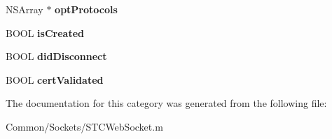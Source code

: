 \begin{DoxyCompactItemize}
N\+S\+Array $\ast$ {\bfseries opt\+Protocols}
\item 
\hypertarget{category_s_t_c_web_socket_07_08_a173c79402beec0cdde99c56f11dd463b}{}\label{category_s_t_c_web_socket_07_08_a173c79402beec0cdde99c56f11dd463b} 
B\+O\+OL {\bfseries is\+Created}
\item 
\hypertarget{category_s_t_c_web_socket_07_08_a35eb3ec72e5e03171e9656cbe5f0d1b9}{}\label{category_s_t_c_web_socket_07_08_a35eb3ec72e5e03171e9656cbe5f0d1b9} 
B\+O\+OL {\bfseries did\+Disconnect}
\item 
\hypertarget{category_s_t_c_web_socket_07_08_af63dc5966590ee24f86d2dae470b48cb}{}\label{category_s_t_c_web_socket_07_08_af63dc5966590ee24f86d2dae470b48cb} 
B\+O\+OL {\bfseries cert\+Validated}
\end{DoxyCompactItemize}


The documentation for this category was generated from the following file\+:\begin{DoxyCompactItemize}
\item 
Common/\+Sockets/S\+T\+C\+Web\+Socket.\+m\end{DoxyCompactItemize}
